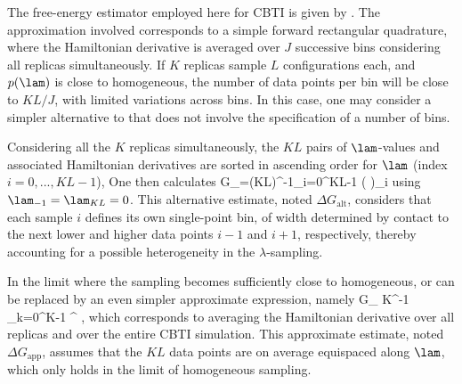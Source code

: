 %
%
The free-energy estimator employed here for CBTI is
given by .
%
The approximation involved corresponds to a 
simple forward rectangular quadrature, where the Hamiltonian derivative is 
averaged over $J$ successive bins considering all replicas simultaneously.
%
%
If $K$ replicas sample $L$ configurations each, and $p(\lam)$ is close to homogeneous,
the number of data points per bin will be close to $K L/J$, with limited variations across bins. 
%
In this case, one may consider a simpler alternative to  that does 
not involve the specification of a number of bins.
%


Considering all the $K$ replicas simultaneously,
the $KL$ pairs of $\lam$-values and associated Hamiltonian 
derivatives are sorted in ascending order for $\lam$ (index $i=0,...,KL-1$),
One then calculates
%
\Delta G_{}=(KL)^{-1}\sum\limits_{i=0}^{KL-1}  \left ( \frac{\partial \ham}{\partial \lam}\right )_{i}
\eeq
%
using $\lam_{-1}=\lam_{KL}=0$.
%
This alternative estimate, noted $\Delta G_{\mathrm{alt}}$, considers that each sample $i$ defines 
its own single-point bin, of width determined by contact to the next lower and higher 
data points $i-1$ and $i+1$, respectively, thereby accounting for a possible heterogeneity in the $\lambda$-sampling.
%


In the limit where the sampling becomes sufficiently close to homogeneous, 
 or  can be replaced by an even simpler 
approximate expression, namely 
%
  \Delta G_{} \approx K^{-1} \sum_{k=0}^{K-1} \left \langle {}  \right \rangle ^{\dagger \star} ,
\eeq
%
which corresponds to averaging the Hamiltonian derivative over all replicas and over the entire CBTI simulation. 
This approximate estimate, noted $\Delta G_{\mathrm{app}}$, assumes that the $KL$ data points are on average equispaced along $\lam$, 
which only holds in the limit of homogeneous sampling.
%


